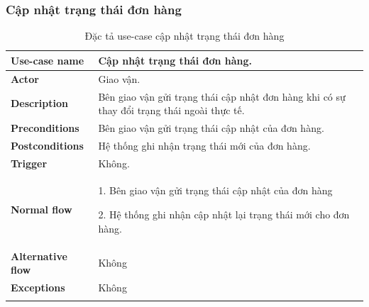 \subsubsection{Cập nhật trạng thái đơn hàng}
{
    \setlength\extrarowheight{6pt}
    \begin{longtable}{| p{} | p{} |}
        \hline
        \textbf{Use-case name}
         &
        Cập nhật trạng thái đơn hàng.
        \\
        \hline
        \textbf{Actor}
         &
        Giao vận.
        \\
        \hline
        \textbf{Description}
         &
        Bên giao vận gửi trạng thái cập nhật đơn hàng khi có sự thay đổi trạng thái ngoài thực tế.
        \\
        \hline
        \textbf{Preconditions}
         &
        Bên giao vận gửi trạng thái cập nhật của đơn hàng.
        \\
        \hline
        \textbf{Postconditions}
         &
        Hệ thống ghi nhận trạng thái mới của đơn hàng.
        \\
        \hline
        \textbf{Trigger}
         &
        Không.
        \\
        \hline
        \textbf{Normal flow}
         &
        1. Bên giao vận gửi trạng thái cập nhật của đơn hàng

        2. Hệ thống ghi nhận cập nhật lại trạng thái mới cho đơn hàng.
        \\
        \hline
        \textbf{Alternative flow}
         &
        Không
        \\
        \hline
        \textbf{Exceptions}
         &
        Không
        \\
        \hline
        \caption{Đặc tả use-case cập nhật trạng thái đơn hàng}
    \end{longtable}
}

